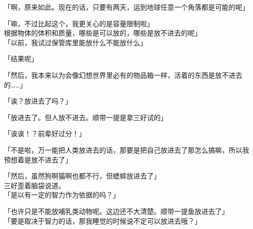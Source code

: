 「啊，原来如此。现在的话，只要有两天，运到地球任意一个角落都是可能的呢」

「嘛，不过比起这个，我更关心的是容量限制啦」\\

根据物体的体积和质量，哪些是可以放的，哪些是放不进去的呢」\\

「以前，我试过保管库里能放什么不能放什么」

「结果呢」

「然后，我本来以为会像幻想世界里必有的物品箱一样，活着的东西是放不进去的……」

「诶？放进去了吗？」

「放进去了。但人放不进去。顺带一提是拿三好试的」

「诶诶！？前辈好过分！」

「不是啦，万一能把人类放进去的话，那要是把自己放进去了那怎么搞嘛，所以我预想着是放不进去了」

「然后，虽然狗啊猫啊也都不行，但蟋蟀放进去了」\\

三好歪着脑袋说道。\\

「是以有一定的智力作为依据的吗？」

「也许只是不能放哺乳类动物呢。这边还不大清楚。顺带一提鱼放进去了」\\

「要是取决于智力的话，那我睡觉的时候说不定可以放进去哦？」

